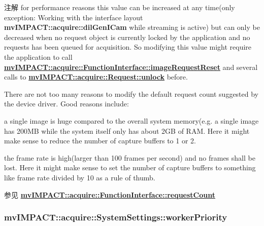 \begin{DoxyNote}{注解}
for performance reasons this value can be increased at any time(only exception\+: Working with the interface layout {\bfseries mv\+I\+M\+P\+A\+C\+T\+::acquire\+::dil\+Gen\+I\+Cam} while streaming is active) but can only be decreased when no request object is currently locked by the application and no requests has been queued for acquisition. So modifying this value might require the application to call {\bfseries \hyperlink{classmv_i_m_p_a_c_t_1_1acquire_1_1_function_interface_a234b2c6e31f3e83629501da47095c54f}{mv\+I\+M\+P\+A\+C\+T\+::acquire\+::\+Function\+Interface\+::image\+Request\+Reset}} and several calls to {\bfseries \hyperlink{classmv_i_m_p_a_c_t_1_1acquire_1_1_request_a3c30ced407d20caef49e3148257cd91e}{mv\+I\+M\+P\+A\+C\+T\+::acquire\+::\+Request\+::unlock}} before.
\end{DoxyNote}
There are not too many reasons to modify the default request count suggested by the device driver. Good reasons include\+:


\begin{DoxyItemize}
\item a single image is huge compared to the overall system memory(e.\+g. a single image has 200\+M\+B while the system itself only has about 2\+G\+B of R\+A\+M. Here it might make sense to reduce the number of capture buffers to 1 or 2.
\item the frame rate is high(larger than 100 frames per second) and no frames shall be lost. Here it might make sense to set the number of capture buffers to something like frame rate divided by 10 as a rule of thumb.
\end{DoxyItemize}

\begin{DoxySeeAlso}{参见}
{\bfseries \hyperlink{classmv_i_m_p_a_c_t_1_1acquire_1_1_function_interface_af013eddce4d0a33e580079969d1ce3c0}{mv\+I\+M\+P\+A\+C\+T\+::acquire\+::\+Function\+Interface\+::request\+Count}} 
\end{DoxySeeAlso}
\hypertarget{classmv_i_m_p_a_c_t_1_1acquire_1_1_system_settings_aafbaa96af758fe0681ac20ca0746b229}{
\subsubsection[{worker\+Priority}]{ mv\+I\+M\+P\+A\+C\+T\+::acquire\+::\+System\+Settings\+::worker\+Priority}}\label{classmv_i_m_p_a_c_t_1_1acquire_1_1_system_settings_aafbaa96af758fe0681ac20ca0746b229}


